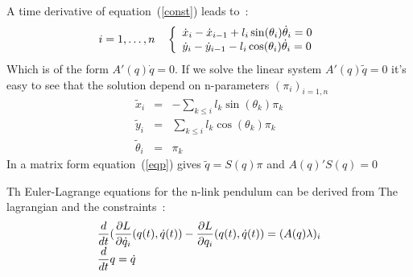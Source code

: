A time derivative of equation~(\ref{const}) leads to~:
\begin{equation}
	i=1,\ldots,n \quad \left\{
	\begin{array}{lcl}
	 \dot{x}_i -\dot{x}_{i-1} + l_i \sin(\theta_i)\dot{\theta}_i =0 \\
	 \dot{y}_i -\dot{y}_{i-1} - l_i \cos(\theta_i) \dot{\theta}_i =0 
	\end{array} \right.
\label{const}
\end{equation}
Which is of the form $A'(q) \dot{q} =0$.
If we solve the linear system $ A'(q)\tilde{q}=0 $ it's easy to see
that the solution depend on n-parameters $(\pi_i)_{i=1,n}$
\begin{eqnarray}
	\tilde{x}_i &=& - \sum_{k\le i} l_k \sin(\theta_k) \pi_k\\
	\tilde{y}_i &=&  \sum_{k\le i} l_k \cos(\theta_k) \pi_k\\
	\tilde{\theta}_i &=& \pi_k
\label{eqp}
\end{eqnarray}
In a  matrix form equation~(\ref{eqp}) gives $\tilde{q}=S(q)\pi$ and 
$ A(q)'S(q)=0$ 

Th Euler-Lagrange equations for the n-link pendulum can be derived
from The lagrangian and the constraints~:
\def\derivt{ {d \over dt}}
\def\derp#1#2{ { \partial #1 \over \partial #2}}
\begin{equation}
		\begin{array}{l} 
	\displaystyle \derivt ( \derp{L}{\dotq_i}(q(t),\dotq(t)) 
	- \derp{L}{q_i}(q(t),\dotq(t)) = (A(q)\lambda)_i \\
		\displaystyle \derivt q = \dotq
		\end{array}
\end{equation}





